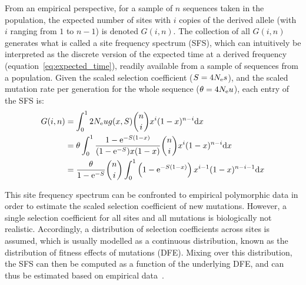 From an empirical perspective, for a sample of $n$ sequences taken in the population, the expected number of sites with $i$ copies of the derived \gls{allele} (with $i$ ranging from $1$ to $n - 1$) is denoted $G(i, n)$.
The collection of all $G(i, n)$ generates what is called a site frequency spectrum (\acrshort{SFS}), which can intuitively be interpreted as the discrete version of the expected time at a derived frequency (equation~\ref{eq:expected_time}), readily available from a sample of sequences from a population.
Given the scaled selection coefficient ($S=4 N_{\text{e}} s$), and the scaled mutation rate per generation for the whole sequence ($\theta = 4 N_{\text{e}} u $), each entry of the \acrshort{SFS} is:
\begin{align}
    G(i, n) & = \int_{0}^{1}  2 N_{\text{e}} u g(x, S) \binom{n}{i} x^{i} (1-x)^{n-i} \mathrm{d} x \\
    & = \theta \int_{0}^{1} \dfrac{1 - \text{e}^{-S(1-x)}}{(1 - \text{e}^{-S})x(1-x)} \binom{n}{i} x^{i} (1-x)^{n-i} \mathrm{d} x \\
    & =  \dfrac{\theta }{1 - \text{e}^{-S}} \binom{n}{i} \int_{0}^{1} \left( 1 - \text{e}^{-S(1-x)} \right) x^{i-1} (1-x)^{n-i-1} \mathrm{d} x
\end{align}

This site frequency spectrum can be confronted to empirical \gls{polymorphic} data in order to estimate the scaled selection coefficient of new mutations.
However, a single selection coefficient for all sites and all mutations is biologically not realistic.
Accordingly, a distribution of selection coefficients across sites is assumed, which is usually modelled as a continuous distribution, known as the distribution of fitness effects of mutations (\acrshort{DFE}).
Mixing over this distribution, the \acrshort{SFS} can then be computed as a function of the underlying \acrshort{DFE}, and can thus be estimated based on empirical data~\citep{eyre-walker_distribution_2006, eyre-walker_estimating_2009}.


